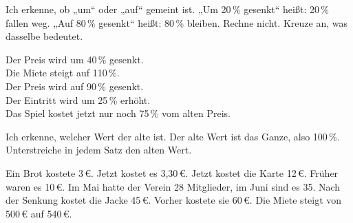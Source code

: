 \clearpage
\hypertarget{e4}{}
\setcounter{aufgabe}{38}

\begin{aufgabe}{Ich erkenne, ob „um“ oder „auf“ gemeint ist. „Um 20\,\% gesenkt“ heißt: 20\,\% fallen weg. „Auf 80\,\% gesenkt“ heißt: 80\,\% bleiben. Rechne nicht. Kreuze an, was dasselbe bedeutet.}
\begin{teile}
\teil Der Preis wird um 40\,\% gesenkt. \\ \quad{}
\teil Die Miete steigt auf 110\,\%. \\ \quad{}
\teil Der Preis wird auf 90\,\% gesenkt. \\ \quad{}
\teil Der Eintritt wird um 25\,\% erhöht. \\ \quad{}
\teil Das Spiel kostet jetzt nur noch 75\,\% vom alten Preis. \\ \quad{}
\end{teile}
\end{aufgabe}

\begin{aufgabe}{Ich erkenne, welcher Wert der alte ist. Der alte Wert ist das Ganze, also 100\,\%. Unterstreiche in jedem Satz den alten Wert.}
\begin{teile}
\teil Ein Brot kostete 3\,€. Jetzt kostet es 3,30\,€.
\teil Jetzt kostet die Karte 12\,€. Früher waren es 10\,€.
\teil Im Mai hatte der Verein 28 Mitglieder, im Juni sind es 35.
\teil Nach der Senkung kostet die Jacke 45\,€. Vorher kostete sie 60\,€.
\teil Die Miete steigt von 500\,€ auf 540\,€.
\end{teile}
\end{aufgabe}

